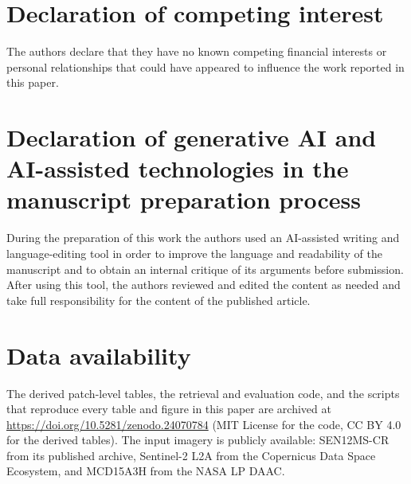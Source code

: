 \documentclass[a4paper,fleqn]{cas-dc}
\begin{document}
\section*{Declaration of competing interest}

The authors declare that they have no known competing financial interests or personal
relationships that could have appeared to influence the work reported in this paper.

\section*{Declaration of generative AI and AI-assisted technologies in the manuscript
preparation process}

During the preparation of this work the authors used an AI-assisted writing and
language-editing tool in order to improve the language and readability of the
manuscript and to obtain an internal critique of its arguments before submission. After
using this tool, the authors reviewed and edited the content as needed and take full
responsibility for the content of the published article.

\section*{Data availability}

The derived patch-level tables, the retrieval and evaluation code, and the scripts that
reproduce every table and figure in this paper are archived at
\url{https://doi.org/10.5281/zenodo.24070784} (MIT License for the code, CC BY 4.0 for
the derived tables). The input imagery is publicly available: SEN12MS-CR from its
published archive, Sentinel-2 L2A from the Copernicus Data Space Ecosystem, and
MCD15A3H from the NASA LP DAAC.
\end{document}
